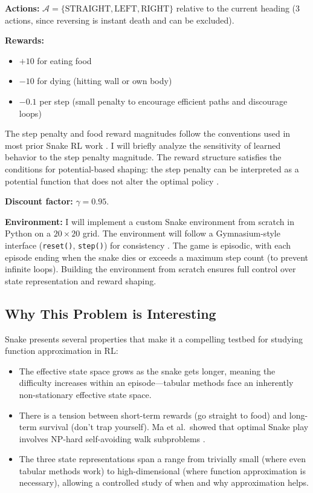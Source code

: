 \documentclass[11pt]{article}
\begin{document}
\textbf{Actions:} $\mathcal{A} = \{\text{STRAIGHT}, \text{LEFT}, \text{RIGHT}\}$ relative to the current heading (3 actions, since reversing is instant death and can be excluded).

\textbf{Rewards:}
\begin{itemize}[nosep]
    \item $+10$ for eating food
    \item $-10$ for dying (hitting wall or own body)
    \item $-0.1$ per step (small penalty to encourage efficient paths and discourage loops)
\end{itemize}

The step penalty and food reward magnitudes follow the conventions used in most prior Snake RL work \citep{wei2018autonomous, jiang2021snakeai}. I will briefly analyze the sensitivity of learned behavior to the step penalty magnitude. The reward structure satisfies the conditions for potential-based shaping: the step penalty can be interpreted as a potential function that does not alter the optimal policy \citep{ng1999reward}.

\textbf{Discount factor:} $\gamma = 0.95$.

\textbf{Environment:} I will implement a custom Snake environment from scratch in Python on a $20 \times 20$ grid. The environment will follow a Gymnasium-style interface (\texttt{reset()}, \texttt{step()}) for consistency \citep{gymnasium}. The game is episodic, with each episode ending when the snake dies or exceeds a maximum step count (to prevent infinite loops). Building the environment from scratch ensures full control over state representation and reward shaping.

\subsection{Why This Problem is Interesting}

Snake presents several properties that make it a compelling testbed for studying function approximation in RL:

\begin{itemize}[nosep]
    \item The effective state space grows as the snake gets longer, meaning the difficulty increases within an episode---tabular methods face an inherently non-stationary effective state space.
    \item There is a tension between short-term rewards (go straight to food) and long-term survival (don't trap yourself). Ma et al.\ showed that optimal Snake play involves NP-hard self-avoiding walk subproblems \citep{ma2016snake}.
    \item The three state representations span a range from trivially small (where even tabular methods work) to high-dimensional (where function approximation is necessary), allowing a controlled study of when and why approximation helps.
\end{itemize}
\end{document}
